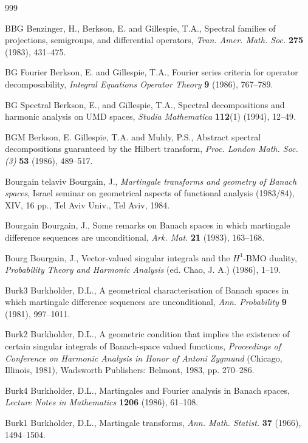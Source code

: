 \documentclass[mmath,12pt]{unswthesis}   %
\numberwithin{equation}{section}
\begin{document}
\begin{thebibliography}{999}

\bibitem
{BBG} Benzinger, H., Berkson, E. and Gillespie, T.A.,
Spectral families of projections, semigroups, and differential operators,
\textit{Tran. Amer. Math. Soc.} \textbf{275} (1983), 431--475.

\bibitem
{BG Fourier} Berkson, E. and Gillespie, T.A.,
Fourier series criteria for operator decomposability,
\textit{Integral Equations Operator Theory} \textbf{9} (1986), 767--789.

\bibitem
{BG Spectral} Berkson, E., and Gillespie, T.A.,
Spectral decompositions and harmonic analysis on UMD spaces,
\textit{Studia Mathematica} \textbf{112}(1) (1994), 12--49.

\bibitem
{BGM} Berkson, E. Gillespie, T.A. and Muhly, P.S.,
Abstract spectral decompositions guaranteed by the Hilbert transform,
\textit{Proc. London Math. Soc. (3)} \textbf{53} (1986), 489--517.

\bibitem
{Bourgain telaviv} 
Bourgain, J., {\em Martingale transforms and geometry of Banach spaces},
Israel seminar on geometrical aspects of functional analysis
(1983/84), XIV, 16 pp., Tel Aviv Univ., Tel Aviv, 1984.

\bibitem
{Bourgain} Bourgain, J.,
Some remarks on Banach spaces in which martingale difference sequences are
unconditional,
\textit{Ark. Mat.} \textbf{21} (1983), 163--168.

\bibitem
{Bourg} Bourgain, J.,
Vector-valued singular integrals and the $H^1$-BMO duality,
\textit{Probability Theory and Harmonic Analysis} (ed. Chao, J. A.) (1986), 
1--19.

\bibitem
{Burk3} Burkholder, D.L.,
A geometrical characterisation of Banach spaces in which martingale difference
sequences are unconditional,
\textit{Ann. Probability} \textbf{9} (1981), 997--1011.

\bibitem
{Burk2} Burkholder, D.L.,
A geometric condition that implies the existence of certain singular integrals
of Banach-space valued functions,
\textit{Proceedings of Conference on Harmonic Analysis in Honor of Antoni
Zygmund} (Chicago, Illinois, 1981), Wadsworth Publishers: Belmont,
1983, pp. 270--286.

\bibitem
{Burk4} Burkholder, D.L.,
Martingales and Fourier analysis in Banach spaces,
\textit{Lecture Notes in Mathematics} \textbf{1206} (1986), 61--108.

\bibitem
{Burk1} Burkholder, D.L.,
Martingale transforms,
\textit{Ann. Math. Statist.} \textbf{37} (1966), 1494--1504.


\end{thebibliography}
\end{document}
